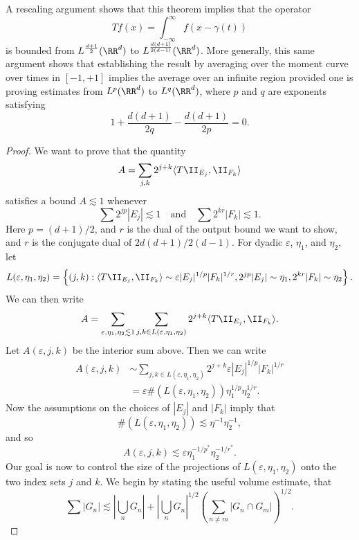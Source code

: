\begin{remark}
    A rescaling argument shows that this theorem implies that the operator
    \[ Tf(x) = \int_{-\infty}^\infty f(x - \gamma(t)) \]
    is bounded from $L^{\frac{d+1}{2}}(\RR^d)$ to $L^{\frac{d(d+1)}{2(d-1)}}(\RR^d)$. More generally, this same argument shows that establishing the result by averaging over the moment curve over times in $[-1,+1]$ implies the average over an infinite region provided one is proving estimates from $L^p(\RR^d)$ to $L^q(\RR^d)$, where $p$ and $q$ are exponents satisfying
    \[ 1 + \frac{d(d+1)}{2q} - \frac{d(d+1)}{2p} = 0. \]
\end{remark}

\begin{proof}
    We want to prove that the quantity
    \[ A = \sum_{j,k} 2^{j+k} \langle T \II_{E_j}, \II_{F_k} \rangle \]
    satisfies a bound $A \lesssim 1$ whenever
    \[ \sum 2^{jp} |E_j| \lesssim 1 \quad\text{and}\quad \sum 2^{kr} |F_k| \lesssim 1. \]
    Here $p = (d+1)/2$, and $r$ is the dual of the output bound we want to show, and $r$ is the conjugate dual of $2d(d+1)/2(d-1)$. For dyadic $\varepsilon$, $\eta_1$, and $\eta_2$, let
    \[ L(\varepsilon, \eta_1, \eta_2) = \left\{ (j,k) : \langle T \II_{E_j}, \II_{F_k} \rangle \sim \varepsilon |E_j|^{1/p} |F_k|^{1/r}, 2^{jp} |E_j| \sim \eta_1, 2^{kr} |F_k| \sim \eta_2 \right\}. \]
    We can then write
    \[ A = \sum_{\varepsilon, \eta_1, \eta_2 \lesssim 1} \sum_{j,k \in L(\varepsilon,\eta_1,\eta_2)} 2^{j+k} \langle T \II_{E_j}, \II_{F_k} \rangle. \]
    Let $A(\varepsilon,j,k)$ be the interior sum above. Then we can write
    \begin{align*}
        A(\varepsilon,j,k) &\sim \sum_{j,k \in L(\varepsilon,\eta_1,\eta_2)} 2^{j+k} \varepsilon |E_j|^{1/p} |F_k|^{1/r}\\
        &= \varepsilon \#(L(\varepsilon,\eta_1,\eta_2)) \eta_1^{1/p} \eta_2^{1/r}.
    \end{align*}
    Now the assumptions on the choices of $|E_j|$ and $|F_k|$ imply that
    \[ \#(L(\varepsilon,\eta_1,\eta_2)) \lesssim \eta^{-1} \eta_2^{-1}, \]
    and so
    \[ A(\varepsilon,j,k) \lesssim \varepsilon \eta_1^{-1/p^*} \eta_2^{-1/r^*}. \]
    Our goal is now to control the size of the projections of $L(\varepsilon,\eta_1,\eta_2)$ onto the two index sets $j$ and $k$. We begin by stating the useful volume estimate, that
    \[ \sum |G_n| \lesssim |\bigcup_n G_n| + |\bigcup_n G_n|^{1/2} ( \sum_{n \neq m} |G_n \cap G_m| )^{1/2}. \]

\end{proof}
